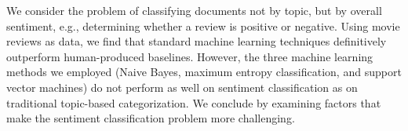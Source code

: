 We consider the problem of classifying documents
not by topic, but by overall sentiment,
e.g., determining whether a review
is positive or negative. Using movie reviews
as data, we find that standard machine
learning techniques definitively outperform
human-produced baselines. However,
the three machine learning methods
we employed (Naive Bayes, maximum entropy
classification, and support vector machines)
do not perform as well on sentiment
classification as on traditional topic-based
categorization. We conclude by examining
factors that make the sentiment classification
problem more challenging.